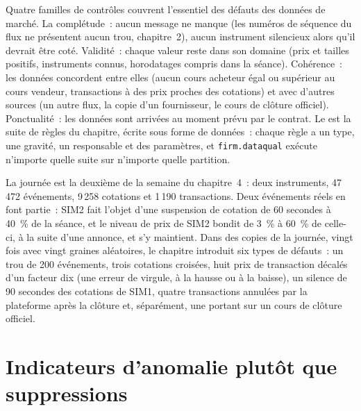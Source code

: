 Quatre familles de contrôles couvrent l'essentiel des défauts des données de marché. La complétude~: aucun message ne manque (les numéros de séquence du flux ne présentent aucun
trou, chapitre~2), aucun instrument silencieux alors qu'il devrait être coté. Validité~: chaque valeur reste dans son domaine (prix et tailles positifs,
instruments connus, horodatages compris dans la séance). Cohérence~: les données concordent entre elles (aucun cours acheteur égal ou supérieur au cours vendeur, transactions
à des prix proches des cotations) et avec d'autres sources (un autre flux, la copie d'un fournisseur, le cours de clôture officiel). Ponctualité~: les données sont arrivées
au moment prévu par le contrat. Le  est la suite de règles du chapitre, écrite sous forme de données~: chaque règle a
un type, une gravité, un responsable et des paramètres, et \texttt{firm.dataqual} exécute n'importe quelle suite sur n'importe quelle partition.

\label{lst:pl:data-quality-and-lineage:rules}

La journée est la deuxième de la semaine du chapitre~4~: deux instruments, 47\,472 événements, 9\,258 cotations et 1\,190 transactions. Deux
événements réels en font partie~: SIM2 fait l'objet d'une suspension de cotation de 60 secondes à 40~\% de la séance, et le niveau de prix de SIM2 bondit de 3~\% à 60~\% de celle-ci,
à la suite d'une annonce, et s'y maintient. Dans des copies de la journée, vingt fois avec vingt graines aléatoires, le chapitre introduit six types de défauts~: un trou de
200 événements, trois cotations croisées, huit prix de transaction décalés d'un facteur dix (une erreur de virgule, à la hausse ou à la baisse), un silence de 90 secondes des cotations de
SIM1, quatre transactions annulées par la plateforme après la clôture et, séparément, une  portant sur un cours de clôture officiel.

\section{Indicateurs d'anomalie plutôt que suppressions}

